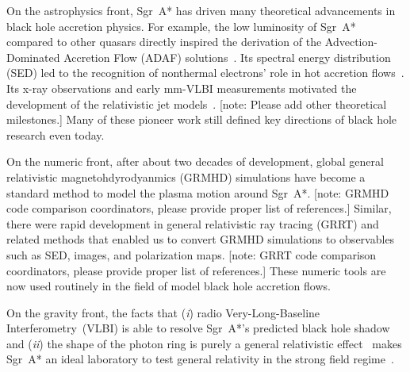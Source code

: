 \documentclass[twocolumn,tighten,dvipsnames]{aastex63}
\newcommand\sgra{Sgr~A*\xspace}
\newcommand\<{{\langle}}
\renewcommand\>{{\rangle}} %
\newcommand\note[1]{{\color{OliveGreen}[note: #1]}}
\begin{document}
On the astrophysics front, \sgra has driven many theoretical
advancements in black hole accretion physics.
For example, the low luminosity of \sgra compared to other quasars
directly inspired the derivation of the Advection-Dominated Accretion
Flow (ADAF) solutions~\citep{1994ApJ...428L..13N, 1995ApJ...444..231N,
  1995ApJ...452..710N, 1996A&AS..120C.287N, 1998ApJ...492..554N}.
Its spectral energy distribution (SED) led to the recognition of
nonthermal electrons' role in hot accretion
flows~\citep{2000ApJ...541..234O}.
Its x-ray observations and early mm-VLBI measurements motivated the
development of the relativistic jet models~\citep{2000A&A...362..113F,
  2004A&A...414..895F, 2005ApJ...635.1203M}.
\note{Please add other theoretical milestones.}
Many of these pioneer work still defined key directions of black hole
research even today.

On the numeric front, after about two decades of development, global
general relativistic magnetohdyrodyanmics (GRMHD) simulations
\citep[e.g.,][]{2000ApJ...528..462H, 2003ApJ...589..458D,
  2003ApJ...589..444G, 2007CQGra..24S.235G, 2012ApJS..201....9F,
  2014ApJ...796...22F, 2016ApJS..225...22W, 2017ApJS..231...17A,
  2018JPhCS1031a2008O, 2019A&A...629A..61O, 2019ApJS..243...26P} have
become a standard method to model the plasma motion around \sgra.
\note{GRMHD code comparison coordinators, please provide proper list
  of references.}
Similar, there were rapid development in general relativistic ray
tracing (GRRT) and related methods
\citep[e.g.,][]{2009ApJ...696.1616D, 2009ApJS..184..387D,
  2012ApJ...745....1P, 2013ApJ...777...11S, 2013ApJ...777...13C,
  2016MNRAS.462..115D, 2016ApJ...820..105P, 2018ApJ...867...59C,
  2018A&A...613A...2B, 2020ApJ...897..148G, 2020arXiv200703045B} that
enabled us to convert GRMHD simulations to observables such as SED,
images, and polarization maps.
\note{GRRT code comparison coordinators, please provide proper list of
  references.}
These numeric tools are now used routinely in the field of model black
hole accretion flows.

On the gravity front, the facts that (\emph{i}) radio
Very-Long-Baseline Interferometry~(VLBI) is able to resolve \sgra's
predicted black hole shadow~\citep{2000ApJ...528L..13F} and
(\emph{ii}) the shape of the photon ring is purely a general
relativistic effect~\citep{2010ApJ...718..446J} makes \sgra an ideal
laboratory to test general relativity in the strong field
regime~\citep{2010ApJ...718..446J, 2014ApJ...784....7B,
  2015ApJ...802...63B, 2015ApJ...814..115P, 2016ApJ...818..121P,
  2016PhRvL.117i1101J, 2019GReGr..51..137P}.
\end{document}
